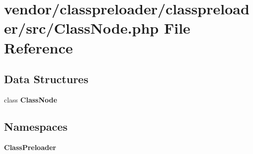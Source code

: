 \section{vendor/classpreloader/classpreloader/src/\+Class\+Node.php File Reference}
\label{classpreloader_2classpreloader_2src_2_class_node_8php}
\subsection*{Data Structures}
\begin{DoxyCompactItemize}
\item 
class {\bf Class\+Node}
\end{DoxyCompactItemize}
\subsection*{Namespaces}
\begin{DoxyCompactItemize}
\item 
 {\bf Class\+Preloader}
\end{DoxyCompactItemize}
